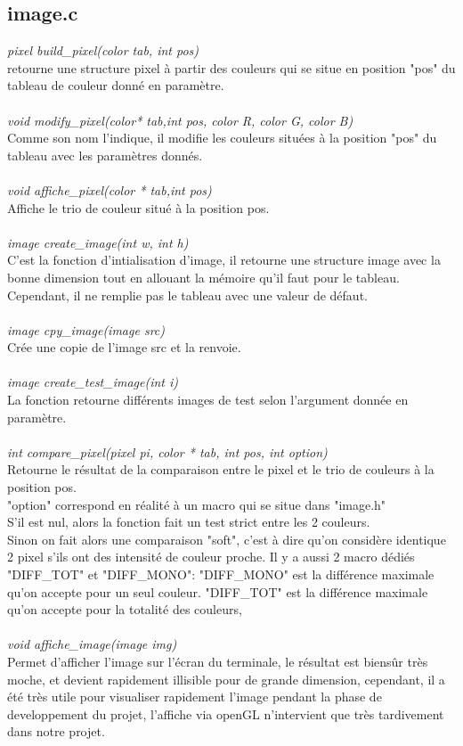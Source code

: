 \documentclass[12pt, letterpaper]{article}
\begin{document}
\subsection{image.c}
\textit{pixel build\_pixel(color \*tab, int pos)}\\
retourne une structure pixel à partir des couleurs qui se situe 
en position "pos" du tableau de couleur donné en paramètre.\\
\\
\textit{void modify\_pixel(color* tab,int pos, color R, color G, color B)}\\
Comme son nom l'indique, il modifie les couleurs situées à la position "pos" du tableau avec les paramètres donnés.\\
\\
\textit{void affiche\_pixel(color * tab,int pos)}\\
Affiche le trio de couleur situé à la position pos.
\\\\
\textit{image create\_image(int w, int h)}\\
C'est la fonction d'intialisation d'image, il retourne une structure image avec la bonne dimension
tout en allouant la mémoire qu'il faut pour le tableau. Cependant, il ne remplie pas le tableau avec une 
valeur de défaut.
\\\\
\textit{image cpy\_image(image src)}\\
Crée une copie de l'image src et la renvoie.
\\\\
\textit{image create\_test\_image(int i)}\\
La fonction retourne différents images de test selon l'argument donnée en paramètre.
\\\\
\textit{int compare\_pixel(pixel pi, color * tab, int pos, int option)}\\
Retourne le résultat de la comparaison entre le pixel et le trio de couleurs à la position pos.\\
"option" correspond en réalité à un macro qui se situe dans "image.h"\\
S'il est nul, alors la fonction fait un test strict entre les 2 couleurs.\\
Sinon on fait alors une comparaison "soft", c'est à dire qu'on considère identique 2 pixel s'ils ont des intensité 
de couleur proche. Il y a aussi 2 macro dédiés "DIFF\_TOT" et "DIFF\_MONO":
"DIFF\_MONO" est la différence maximale qu'on accepte pour un seul couleur.
"DIFF\_TOT" est la différence maximale qu'on accepte pour la totalité des couleurs, 
\\\\
\textit{void affiche\_image(image img)}\\
Permet d'afficher l'image sur l'écran du terminale, le résultat est biensûr très moche, et devient 
rapidement illisible pour de grande dimension, cependant, il a été très utile pour visualiser rapidement 
l'image pendant la phase de developpement du projet, l'affiche via openGL n'intervient que très tardivement dans 
notre projet.
\\
\end{document}
